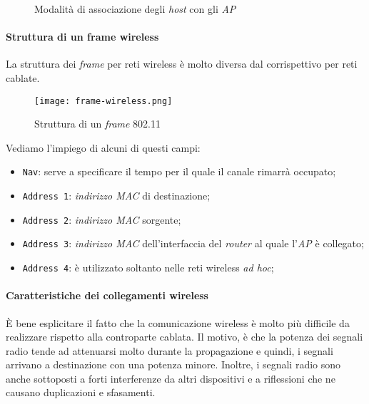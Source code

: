 \begin{figure}[ht!]
    \centering
    \hfill
    \caption{Modalità di associazione degli \emph{host} con gli \emph{AP}}
\end{figure}

\newpage
\paragraph{Struttura di un frame wireless}
La struttura dei \emph{frame} per reti wireless è molto diversa dal
corrispettivo per reti cablate.

\begin{figure}[h!]
    \centering
    \texttt{[image: frame-wireless.png]}
    \caption{Struttura di un \emph{frame} 802.11}
\end{figure}\noindent
Vediamo l'impiego di alcuni di questi campi:
\begin{itemize}
    \item \texttt{Nav}: serve a specificare il tempo per il quale il
    canale rimarrà occupato;
    \item \texttt{Address 1}: \emph{indirizzo MAC} di destinazione;
    \item \texttt{Address 2}: \emph{indirizzo MAC} sorgente;
    \item \texttt{Address 3}: \emph{indirizzo MAC} dell'interfaccia del
    \emph{router} al quale l'\emph{AP} è collegato;
    \item \texttt{Address 4}: è utilizzato soltanto nelle reti wireless
    \emph{ad hoc};
\end{itemize}

\paragraph{Caratteristiche dei collegamenti wireless}
È bene esplicitare il fatto che la comunicazione wireless è molto più difficile
da realizzare rispetto alla controparte cablata. Il motivo, è che la potenza dei
segnali radio tende ad attenuarsi molto durante la propagazione e quindi, i
segnali arrivano a destinazione con una potenza minore. Inoltre, i segnali
radio sono anche sottoposti a forti interferenze da altri dispositivi e a
riflessioni che ne causano duplicazioni e sfasamenti.

